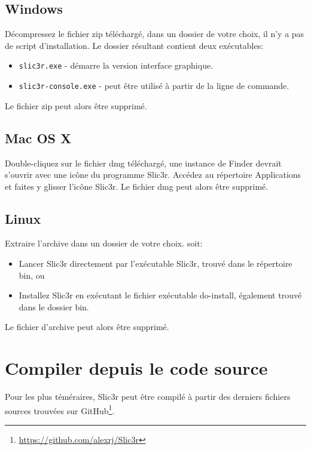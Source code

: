 \subsection{Windows}

D\'ecompressez le fichier zip t\'el\'echarg\'e, dans un dossier de votre choix, il n'y a pas de script d'installation. Le dossier r\'esultant contient deux ex\'ecutables:
\begin{itemize}
\item \texttt{slic3r.exe} - d\'emarre la version interface graphique.
\item \texttt{slic3r-console.exe} - peut \^etre utilis\'e \`a partir de la ligne de commande.
\end{itemize}

Le fichier zip peut alors \^etre supprim\'e.

\subsection{Mac OS X}

Double-cliquez sur le fichier dmg t\'el\'echarg\'e, une instance de Finder devrait s'ouvrir avec une ic\^one du programme Slic3r. Acc\'edez au r\'epertoire Applications et faites y glisser l'ic\^one Slic3r.
Le fichier dmg peut alors \^etre supprim\'e.

\subsection{Linux}

Extraire l'archive dans un dossier de votre choix.
soit:
\begin{itemize}
\item Lancer Slic3r directement par l'ex\'ecutable Slic3r, trouv\'e dans le r\'epertoire bin, ou
\item Installez Slic3r en ex\'ecutant le fichier ex\'ecutable do-install, \'egalement trouv\'e dans le dossier bin.
\end{itemize}
Le fichier d'archive peut alors \^etre supprim\'e.



\section{Compiler depuis le code source} %
\label{sec:building_from_source}

Pour les plus t\'em\'eraires, Slic3r peut \^etre compil\'e \`a partir des derniers fichiers sources trouv\'ees sur GitHub\footnote{\url{https://github.com/alexrj/Slic3r}}.

